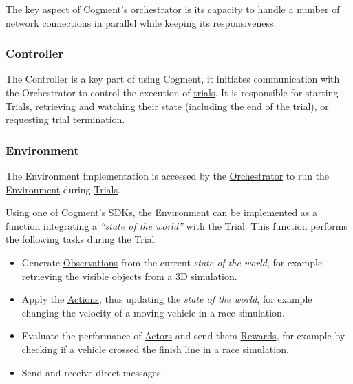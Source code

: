 The key aspect of Cogment's orchestrator is its capacity to handle a
number of network connections in parallel while keeping its
responsiveness.

\hypertarget{controller}{%
\subsubsection{Controller}\label{controller}}

The Controller is a key part of using Cogment, it initiates
communication with the Orchestrator to control the execution of
\href{./glossary.md\#trial}{trials}. It is responsible for starting
\href{./glossary.md\#trial}{Trials}, retrieving and watching their state
(including the end of the trial), or requesting trial termination.

\hypertarget{environment-1}{%
\subsubsection{Environment}\label{environment-1}}

The Environment implementation is accessed by the
\href{./glossary.md\#orchestrator}{Orchestrator} to run the
\href{./glossary.md\#environment}{Environment} during
\href{./glossary.md\#trial}{Trials}.

Using one of \href{../cogment/cogment-api-guide.md}{Cogment's SDKs}, the
Environment can be implemented as a function integrating a \emph{``state
of the world''} with the \href{./glossary.md\#trial}{Trial}. This
function performs the following tasks during the Trial:

\begin{itemize}
\tightlist
\item
  Generate \href{./glossary.md\#observation}{Observations} from the
  current \emph{state of the world}, for example retrieving the visible
  objects from a 3D simulation.
\item
  Apply the \href{./glossary.md\#action}{Actions}, thus updating the
  \emph{state of the world}, for example changing the velocity of a
  moving vehicle in a race simulation.
\item
  Evaluate the performance of \href{./glossary.md\#actor}{Actors} and
  send them \href{./glossary.md\#reward}{Rewards}, for example by
  checking if a vehicle crossed the finish line in a race simulation.
\item
  Send and receive direct messages.
\end{itemize}


